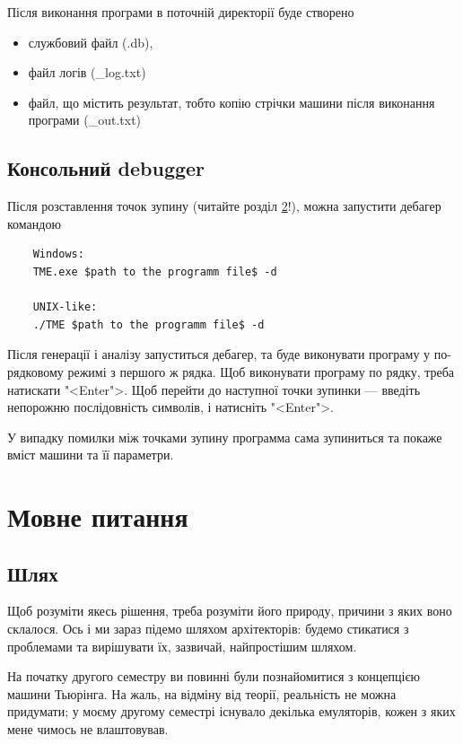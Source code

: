\documentclass[oneside,final,14pt]{extreport}
\begin{document}
Після виконання програми в поточній директорії буде створено 
\begin{itemize}
	\item службовий файл (.db),
	\item файл логів (\*\_log.txt)
	\item файл, що містить результат, тобто копію стрічки машини після виконання програми (\*\_out.txt)
\end{itemize}

\section{Консольний debugger}
Після розставлення точок зупину (читайте розділ \ref{chapter:1}!), можна запустити дебагер командою
\begin{tcolorbox}	
\begin{verbatim}
	Windows:
	TME.exe $path to the programm file$ -d

	UNIX-like:
	./TME $path to the programm file$ -d
\end{verbatim}
\end{tcolorbox}

Після генерації і аналізу запуститься дебагер, та буде виконувати програму у по-рядковому режимі з першого ж рядка.
Щоб виконувати програму по рядку, треба натискати "<Enter">. Щоб перейти до наступної точки зупинки --- введіть непорожню послідовність символів, і натисніть "<Enter">.

У випадку помилки між точками зупину программа сама зупиниться та покаже вміст машини та її параметри.

\chapter{Мовне питання}
\label{chapter:1}

\section{Шлях}
Щоб розуміти якесь рішення, треба розуміти його природу, причини з яких воно склалося. Ось і ми зараз підемо шляхом архітекторів: будемо стикатися з проблемами та вирішувати їх, зазвичай, найпростішим шляхом.

На початку другого семестру ви повинні були познайомитися з концепцією машини Тьюрінга. На жаль, на відміну від теорії, реальність не можна придумати; у моєму другому семестрі існувало декілька емуляторів, кожен з яких мене чимось не влаштовував. 
\end{document}
